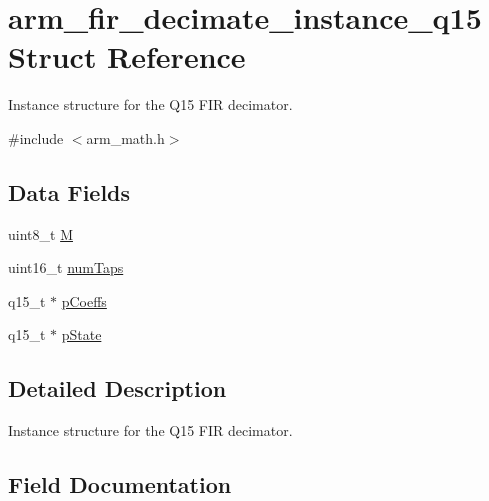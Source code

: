 \hypertarget{structarm__fir__decimate__instance__q15}{}\section{arm\+\_\+fir\+\_\+decimate\+\_\+instance\+\_\+q15 Struct Reference}
\label{structarm__fir__decimate__instance__q15}


Instance structure for the Q15 F\+IR decimator.  




{\ttfamily \#include $<$arm\+\_\+math.\+h$>$}

\subsection*{Data Fields}
\begin{DoxyCompactItemize}
\item 
uint8\+\_\+t \mbox{\hyperlink{structarm__fir__decimate__instance__q15_ae2c8107d00d3c9942e7a20fc598edecf}{M}}
\item 
uint16\+\_\+t \mbox{\hyperlink{structarm__fir__decimate__instance__q15_a751941891e47f522a7f5375fe8990aac}{num\+Taps}}
\item 
q15\+\_\+t $\ast$ \mbox{\hyperlink{structarm__fir__decimate__instance__q15_a7ca181a37f714d174445f486bebce26f}{p\+Coeffs}}
\item 
q15\+\_\+t $\ast$ \mbox{\hyperlink{structarm__fir__decimate__instance__q15_ae29dfdb736374fcddaeaec4b7770170c}{p\+State}}
\end{DoxyCompactItemize}


\subsection{Detailed Description}
Instance structure for the Q15 F\+IR decimator. 

\subsection{Field Documentation}
\mbox{\label{structarm__fir__decimate__instance__q15_ae2c8107d00d3c9942e7a20fc598edecf}} 

